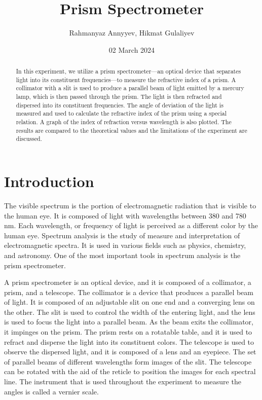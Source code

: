 \documentclass[10pt]{article}
\title{Prism Spectrometer}
\author{Rahmanyaz Annyyev, Hikmat Gulaliyev}
\date{02 March 2024}
\begin{document}
\maketitle

\begin{abstract}
In this experiment, we utilize a prism spectrometer---an optical device that separates light into its constituent frequencies---to measure the refractive index of a prism. A collimator with a slit is used to produce a parallel beam of light emitted by a mercury lamp, which is then passed through the prism. The light is then refracted and dispersed into its constituent frequencies. The angle of deviation of the light is measured and used to calculate the refractive index of the prism using a special relation. A graph of the index of refraction versus wavelength is also plotted. The results are compared to the theoretical values and the limitations of the experiment are discussed.
\end{abstract}

\section{Introduction}
The visible spectrum is the portion of electromagnetic radiation that is visible to the human eye. It is composed of light with wavelengths between 380 and 780 nm. Each wavelength, or frequency of light is perceived as a different color by the human eye\cite{Marcus_1998}. Spectrum analysis is the study of measure and interpretation of electromagnetic spectra. It is used in various fields such as physics, chemistry, and astronomy. One of the most important tools in spectrum analysis is the prism spectrometer. 

A prism spectrometer is an optical device, and it is composed of a collimator, a prism, and a telescope. The collimator is a device that produces a parallel beam of light. It is composed of an adjustable slit on one end and a converging lens on the other. The slit is used to control the width of the entering light, and the lens is used to focus the light into a parallel beam. As the beam exits the collimator, it impinges on the prism. The prism rests on a rotatable table, and it is used to refract and disperse the light into its constituent colors. The telescope is used to observe the dispersed light, and it is composed of a lens and an eyepiece. The set of parallel beams of different wavelengths form images of the slit. The telescope can be rotated with the aid of the reticle to position the images for each spectral line. 
The instrument that is used throughout the experiment to measure the angles is called a vernier scale.
\end{document}
